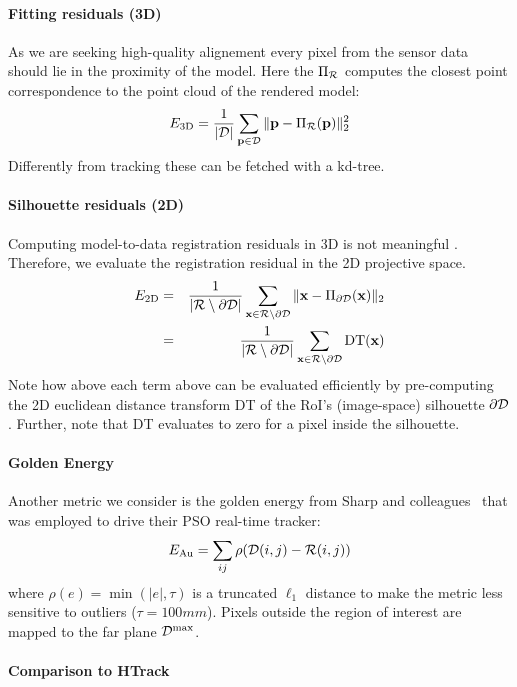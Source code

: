 

\paragraph{Fitting residuals (3D)}
As we are seeking high-quality alignement every pixel from the sensor data should lie in the proximity of the model. Here the $\Pi_{\mathcal{R}}$ computes the closest point correspondence to the point cloud of the rendered model:
\begin{equation}
E_\text{3D} = \frac{1}{|\mathcal{D}|}\sum_{\mathbf{p} \in \mathcal{D}} \| \mathbf{p} - \Pi_{\mathcal{R}}(\mathbf{p}) \|_2^2
\label{eq:metric1}
\end{equation}
Differently from tracking these can be fetched with a kd-tree.

\paragraph{Silhouette residuals (2D)}
Computing model-to-data registration residuals in 3D is not meaningful . Therefore, we evaluate the registration residual in the 2D projective space. 
\begin{eqnarray}
E_\text{2D} 
&=& \frac{1}{|\mathcal{R} \setminus \partial\mathcal{D}|} 
\sum_{\mathbf{x} \in \mathcal{R} \setminus \partial\mathcal{D}} \| \mathbf{x} - \Pi_{\partial\mathcal{D}}(\mathbf{x}) \|_2 \\ 
&=& \frac{1}{|\mathcal{R} \setminus \partial\mathcal{D}|} 
\sum_{\mathbf{x} \in \mathcal{R} \setminus \partial\mathcal{D}} \text{DT}(\mathbf{x})
\label{eq:metric2}
\end{eqnarray}
Note how above each term above can be evaluated efficiently by pre-computing the 2D euclidean distance transform DT of the RoI's (image-space) silhouette $\partial \mathcal{D}$. Further, note that DT evaluates to zero for a pixel inside the silhouette. 



\paragraph{Golden Energy}
Another metric we consider is the golden energy from Sharp and colleagues~ that was employed to drive their PSO real-time tracker:
\begin{equation}
E_{\text{Au}} = \sum_{ij} \rho(\mathcal{D}(i,j) - \mathcal{R}(i,j))
\label{eq:golden}
\end{equation}
where $\rho(e)=\min(|e|,\tau)$ is a truncated $\ell_1$ distance to make the metric less sensitive to outliers ($\tau=100mm$). Pixels outside the region of interest are mapped to the far plane $\mathcal{D}^\text{max}$.


\paragraph{Comparison to HTrack}
